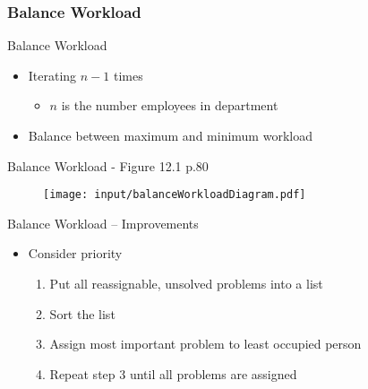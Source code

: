 \subsubsection*{Balance Workload}
\begin{frame}{Balance Workload}
\begin{itemize}
	\item Iterating $n-1$ times
	\begin{itemize}
		\item $n$ is the number employees in department
	\end{itemize}
	\item Balance between maximum and minimum workload
\end{itemize}
\end{frame}
\begin{frame}{Balance Workload - Figure 12.1 p.80}
\begin{figure}
	\centering
		\texttt{[image: input/balanceWorkloadDiagram.pdf]}
	\label{fig:balanceWorkloadDiagram}
\end{figure}
\end{frame}

\begin{frame}{Balance Workload -- Improvements}

\begin{itemize}
	\item Consider priority

	\begin{enumerate}
		\item<2-> Put all reassignable, unsolved problems into a list
		\item<3-> Sort the list
		\item<4-> Assign most important problem to least occupied person
		\item<5-> Repeat step 3 until all problems are assigned
	\end{enumerate}

\end{itemize}

\end{frame}